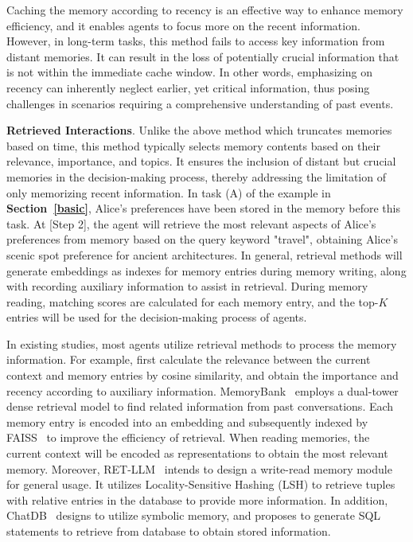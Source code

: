 \documentclass{article}
\theoremstyle{definition}
\theoremstyle{theorem}
\theoremstyle{proof}
\theoremstyle{remark}
\begin{document}
	Caching the memory according to recency is an effective way to enhance memory efficiency, and it enables agents to focus more on the recent information. However, in long-term tasks, this method fails to access key information from distant memories. It can result in the loss of potentially crucial information that is not within the immediate cache window. In other words, emphasizing on recency can inherently neglect earlier, yet critical information, thus posing challenges in scenarios requiring a comprehensive understanding of past events.
	
	\textbf{Retrieved Interactions}.
	Unlike the above method which truncates memories based on time, this method typically selects memory contents based on their relevance, importance, and topics.
	It ensures the inclusion of distant but crucial memories in the decision-making process, thereby addressing the limitation of only memorizing recent information.
	In task (A) of the example in \textbf{Section~\ref{basic}}, Alice's preferences have been stored in the memory before this task. At [Step 2], the agent will retrieve the most relevant aspects of Alice's preferences from memory based on the query keyword "travel", obtaining Alice's scenic spot preference for ancient architectures. In general, retrieval methods will generate embeddings as indexes for memory entries during memory writing, along with recording auxiliary information to assist in retrieval. During memory reading, matching scores are calculated for each memory entry, and the top-$K$ entries will be used for the decision-making process of agents.
	
	In existing studies, most agents utilize retrieval methods to process the memory information.
	For example, \citet{generative_agents} first calculate the relevance between the current context and memory entries by cosine similarity, and obtain the importance and recency according to auxiliary information.
	MemoryBank~\cite{memorybank} employs a dual-tower dense retrieval model to find related information from past conversations. Each memory entry is encoded into an embedding and subsequently indexed by FAISS~\cite{faiss} to improve the efficiency of retrieval. When reading memories, the current context will be encoded as representations to obtain the most relevant memory.
	Moreover, RET-LLM~\cite{ret_llm} intends to design a write-read memory module for general usage. It utilizes Locality-Sensitive Hashing (LSH) to retrieve tuples with relative entries in the database to provide more information.
	In addition, ChatDB~\cite{chatdb} designs to utilize symbolic memory, and proposes to generate SQL statements to retrieve from database to obtain stored information. 
	
\end{document}
